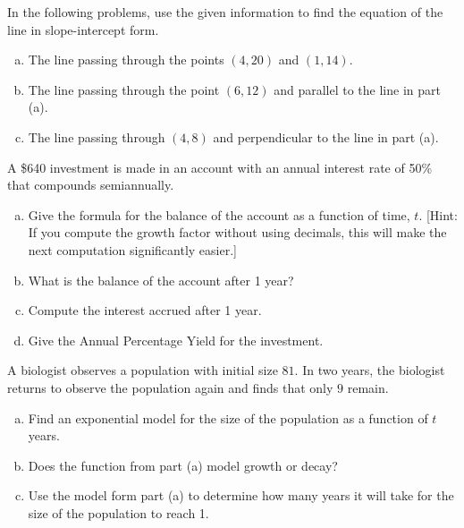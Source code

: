 \documentclass[12pt]{amsart}
\begin{document}
\begin{thm}[10 Points]
  In the following problems, use the given information to find the equation of the line in slope-intercept form.
  \begin{enumerate}[(a)]
  \item
    The line passing through the points $(4,20)$ and $(1,14)$.
    \vspace{1in}
  \item
    The line passing through the point $(6, 12)$ and parallel to the line in part (a).
    \vspace{1in}
  \item
    The line passing through $(4, 8)$ and perpendicular to the line in part (a).
    \vspace{1in}
  \end{enumerate}
\end{thm}

\newpage

\begin{thm}[10 Points]
  A \$640 investment is made in an account with an annual interest rate of 50\% that compounds semiannually.
  \begin{enumerate}[(a)]
  \item
    Give the formula for the balance of the account as a function of time, $t$.
    [Hint: If you compute the growth factor without using decimals, this will make the next computation significantly easier.]
    \vspace{1in}
  \item
    What is the balance of the account after 1 year?
    \vspace{1in}
  \item
    Compute the interest accrued after 1 year.
    \vspace{1in}
  \item
    Give the Annual Percentage Yield for the investment.
    \vspace{1in}
  \end{enumerate}
\end{thm}

\newpage

\begin{thm}[10 Points]
  A biologist observes a population with initial size $81$.
  In two years, the biologist returns to observe the population again and finds that only $9$ remain.
  \begin{enumerate}[(a)]
  \item
    Find an exponential model for the size of the population as a function of $t$ years.
    \vspace{1in}
  \item
    Does the function from part (a) model growth or decay?
    \vspace{1.5in}
  \item
    Use the model form part (a) to determine how many years it will take for the size of the population to reach 1.
    \vspace{1.5in}
  \end{enumerate}
\end{thm}
\end{document}
